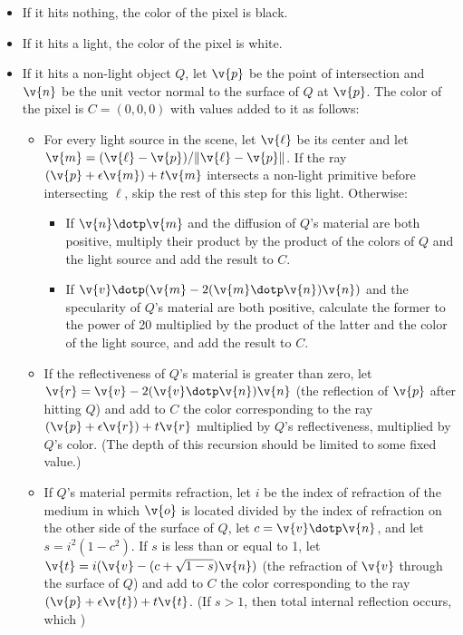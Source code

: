 \documentclass{article}
\begin{document}
\begin{itemize}
\item If it hits nothing, the color of the pixel is black.
\item If it hits a light, the color of the pixel is white.
\item If it hits a non-light object $Q$, let $\v{p}$ be the point of intersection and $\v{n}$ be the unit vector normal to the surface of $Q$ at $\v{p}$.  The color of the pixel is $C = (0, 0, 0)$ with values added to it as follows:
 \begin{itemize}
 \item For every light source in the scene, let $\v{\ell}$ be its center and let $\v{m}=(\v{\ell}-\v{p})/\|\v{\ell}-\v{p}\|$.  If the ray $(\v{p}+\epsilon\v{m})+t\v{m}$ intersects a non-light primitive before intersecting $\ell$, skip the rest of this step for this light.  Otherwise:
  \begin{itemize}
  \item If $\v{n}\dotp\v{m}$ and the diffusion of $Q$'s material are both positive, multiply their product by the product of the colors of $Q$ and the light source and add the result to $C$.
  \item If $\v{v}\dotp(\v{m} - 2(\v{m}\dotp\v{n})\v{n})$ and the specularity of $Q$'s material are both positive, calculate the former to the power of 20 multiplied by the product of the latter and the color of the light source, and add the result to $C$.
  \end{itemize}
 \item If the reflectiveness of $Q$'s material is greater than zero, let $\v{r} = \v{v} - 2(\v{v}\dotp\v{n})\v{n}$ (the reflection of $\v{p}$ after hitting $Q$) and add to $C$ the color corresponding to the ray $(\v{p}+\epsilon\v{r})+t\v{r}$ multiplied by $Q$'s reflectiveness, multiplied by $Q$'s color.  (The depth of this recursion should be limited to some fixed value.)
 \item If $Q$'s material permits refraction, let $i$ be the index of refraction of the medium in which $\v{o}$ is located divided by the index of refraction on the other side of the surface of $Q$, let $c = \v{v}\dotp\v{n}$, and let $s = i^2(1-c^2)$.  If $s$ is less than or equal to 1, let $\v{t} = i(\v{v} - (c+\sqrt{1-s})\v{n})$ (the refraction of $\v{v}$ through the surface of $Q$) and add to $C$ the color corresponding to the ray $(\v{p}+\epsilon\v{t})+t\v{t}$.  (If $s>1$, then total internal reflection occurs, which )
 \end{itemize}
\end{itemize}
\end{document}
